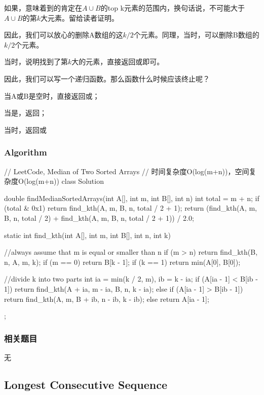 如果，意味着到\fn{A[k/2-1}的肯定在$A \cup B$的top 
k元素的范围内，换句话说，\fn{A[k/2-1}不可能大于$A \cup B$的第$k$大元素。留给读者证明。

因此，我们可以放心的删除A数组的这$k/2$个元素。同理，当时，可以删除B数组的$k/2$个元素。

当时，说明找到了第$k$大的元素，直接返回或即可。

因此，我们可以写一个递归函数。那么函数什么时候应该终止呢？
\begindot
\item 当A或B是空时，直接返回或；
\item 当是，返回；
\item 当时，返回或
\myenddot


\subsubsection{Algorithm}
\begin{Code}
	// LeetCode, Median of Two Sorted Arrays
	// 时间复杂度O(log(m+n))，空间复杂度O(log(m+n))
	class Solution {
		double findMedianSortedArrays(int A[], int m, int B[], int n) {
			int total = m + n;
			if (total & 0x1)
				return find_kth(A, m, B, n, total / 2 + 1);
			return (find_kth(A, m, B, n, total / 2) + find_kth(A, m, B, n, total / 2 + 1)) / 2.0;
		}
		
		static int find_kth(int A[], int m, int B[], int n, int k) {
			//always assume that m is equal or smaller than n
			if (m > n) return find_kth(B, n, A, m, k);
			if (m == 0) return B[k - 1];
			if (k == 1) return min(A[0], B[0]);
			
			//divide k into two parts
			int ia = min(k / 2, m), ib = k - ia;
			if (A[ia - 1] < B[ib - 1])
				return find_kth(A + ia, m - ia, B, n, k - ia);
			else if (A[ia - 1] > B[ib - 1])
				return find_kth(A, m, B + ib, n - ib, k - ib);
			else
				return A[ia - 1];
		}
	};
\end{Code}


\subsubsection{相关题目}

\begindot
\item 无
\myenddot


\subsection{Longest Consecutive Sequence} %
\label{sec:longest-consecutive-sequence}


